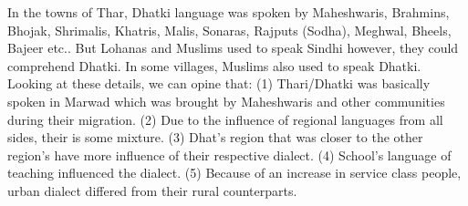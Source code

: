 In the towns of Thar, Dhatki language was spoken by Maheshwaris, Brahmins, Bhojak, Shrimalis, Khatris, Malis, Sonaras, Rajputs (Sodha), Meghwal, Bheels, Bajeer etc.. But Lohanas and Muslims used to speak Sindhi however, they could comprehend Dhatki. In some villages, Muslims also used to speak Dhatki. Looking at these details, we can opine that: (1) Thari/Dhatki was basically spoken in Marwad which was brought by Maheshwaris and other communities during their migration. (2) Due to the influence of regional languages from all sides, their is some mixture. (3) Dhat's region that was closer to the other region's have more influence of their respective dialect. (4) School's language of teaching influenced the dialect. (5) Because of an increase in service class people, urban dialect differed from their rural counterparts.

